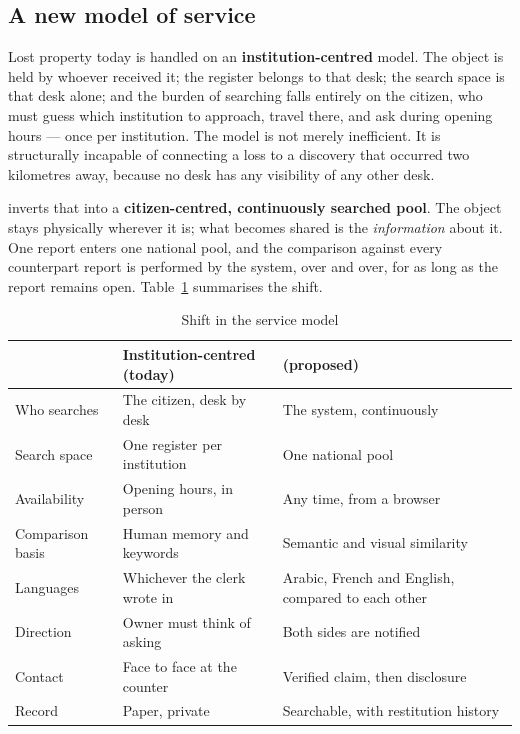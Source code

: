 \subsection{A new model of service}

Lost property today is handled on an \textbf{institution-centred} model. The
object is held by whoever received it; the register belongs to that desk; the
search space is that desk alone; and the burden of searching falls entirely on
the citizen, who must guess which institution to approach, travel there, and ask
during opening hours --- once per institution. The model is not merely
inefficient. It is structurally incapable of connecting a loss to a discovery
that occurred two kilometres away, because no desk has any visibility of any
other desk.

\projectname{} inverts that into a \textbf{citizen-centred, continuously
searched pool}. The object stays physically wherever it is; what becomes shared
is the \emph{information} about it. One report enters one national pool, and the
comparison against every counterpart report is performed by the system, over and
over, for as long as the report remains open. Table~\ref{tab:model-shift}
summarises the shift.

\begin{table}[htbp]
\centering
\caption{Shift in the service model}
\label{tab:model-shift}
\small
\begin{tabularx}{\textwidth}{@{}p{3.1cm} X X@{}}
\toprule
 & \textbf{Institution-centred (today)} & \textbf{\projectname{} (proposed)} \\
\midrule
Who searches      & The citizen, desk by desk & The system, continuously \\
Search space      & One register per institution & One national pool \\
Availability      & Opening hours, in person & Any time, from a browser \\
Comparison basis  & Human memory and keywords & Semantic and visual similarity \\
Languages         & Whichever the clerk wrote in & Arabic, French and English, compared to each other \\
Direction         & Owner must think of asking & Both sides are notified \\
Contact           & Face to face at the counter & Verified claim, then disclosure \\
Record            & Paper, private & Searchable, with restitution history \\
\bottomrule
\end{tabularx}
\end{table}

